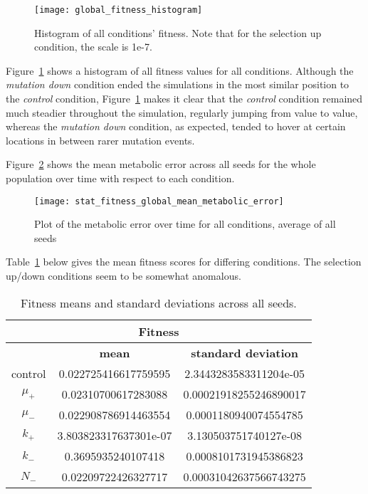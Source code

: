 \begin{figure}[H]
	\texttt{[image: global\_fitness\_histogram]}
	\caption[Mean fitness histogram]{Histogram of all conditions' fitness. Note that for the selection up condition, the scale is 1e-7. }
	\label{fig:global_fitness_histogram}
\end{figure}
Figure~\ref{fig:global_fitness_histogram} shows a histogram of all fitness values for all conditions. Although the \textit{mutation down} condition ended the simulations in the most similar position to the \textit{control} condition, Figure~\ref{fig:global_fitness_histogram} makes it clear that the \textit{control} condition remained much steadier throughout the simulation, regularly jumping from value to value, whereas the \textit{mutation down} condition, as expected, tended to hover at certain locations in between rarer mutation events. 

Figure~\ref{fig:mean_metabolic_error} shows the mean metabolic error across all seeds for the whole population over time with respect to each condition. 
\begin{figure}[H]
	\texttt{[image: stat\_fitness\_global\_mean\_metabolic\_error]}
	\caption[Metabolic error]{Plot of the metabolic error over time for all conditions, average of all seeds}
	\label{fig:mean_metabolic_error}
\end{figure}

Table~\ref{table:fitness_means_std_dev} below gives the mean fitness scores for differing conditions. The selection up/down conditions seem to be somewhat anomalous.
\begin{table}[H]
	\centering
	\begin{tabular}{|c||c|c|}
		\hline
		\multicolumn{3}{c}{\Large \textbf{Fitness}} \\
		\hline
		& \textbf{mean} & \textbf{standard deviation} \\
		\hline \hline
		control & 0.022725416617759595 & 2.3443283583311204e-05 \\
		\hline
		$\mu_+$ & 0.02310700617283088 & 0.00021918255246890017 \\
		\hline
		$\mu_-$ & 0.022908786914463554 & 0.0001180940074554785 \\
		\hline
		$k_+$ & 3.803823317637301e-07 & 3.130503751740127e-08 \\
		\hline
		$k_-$ & 0.3695935240107418	& 0.0008101731945386823 \\
		\hline
		$N_-$ & 0.02209722426327717 & 0.00031042637566743275 \\
		\hline
	\end{tabular}
	\caption[Fitness means and standard deviations.]{Fitness means and standard deviations across all seeds. }
	\label{table:fitness_means_std_dev}
\end{table}


